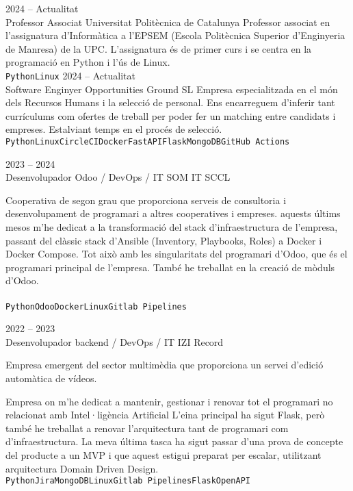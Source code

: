 \documentclass[9pt]{developercv} %
\begin{document}
\begin{entrylist}
	\entry
		{2024 -- Actualitat\\}
		{Professor Associat}
		{Universitat Politècnica de Catalunya}
		{Professor associat en l'assignatura d'Informàtica a l'EPSEM (Escola Politècnica Superior d'Enginyeria de Manresa) de la UPC. L'assignatura és de primer curs i se centra en la programació en Python i l'ús de Linux.
		\\ \texttt{Python}\slashsep\texttt{Linux}}
	\entry
		{2024 -- Actualitat\\}
		{Software Enginyer}
		{Opportunities Ground SL}
		{Empresa especialitzada en el món dels Recursos Humans i la selecció de personal. Ens encarreguem d'inferir tant currículums com ofertes de treball per poder fer un matching entre candidats i empreses. Estalviant temps en el procés de selecció.
		\\ \texttt{Python}\slashsep\texttt{Linux}\slashsep\texttt{CircleCI}\slashsep\texttt{Docker}\slashsep\texttt{FastAPI}\slashsep\texttt{Flask}\slashsep\texttt{MongoDB}\slashsep\texttt{GitHub Actions}}

	\entry
		{2023 -- 2024\\}
		{Desenvolupador Odoo / DevOps / IT}
		{SOM IT SCCL}
		{Cooperativa de segon grau que proporciona serveis de consultoria i desenvolupament de programari a altres cooperatives i empreses.
		aquests últims mesos m'he dedicat a la transformació del stack d'infraestructura de l'empresa, passant del clàssic stack d'Ansible (Inventory, Playbooks, Roles) a Docker i Docker Compose. Tot això amb les singularitats del programari d'Odoo, que és el programari principal de l'empresa. També he treballat en la creació de mòduls d'Odoo.\\
		\\ \texttt{Python}\slashsep\texttt{Odoo}\slashsep\texttt{Docker}\slashsep\texttt{Linux}\slashsep\texttt{Gitlab Pipelines}

		}
	\entry
		{2022 -- 2023\\}
		{Desenvolupador backend / DevOps / IT}
		{IZI Record}
		{Empresa emergent del sector multimèdia que proporciona un servei d'edició automàtica de vídeos.

		Empresa on m'he dedicat a mantenir, gestionar i renovar tot el programari no relacionat amb Intel·ligència Artificial  L'eina principal ha sigut Flask, però també he treballat a renovar
		l'arquitectura tant de programari com d'infraestructura. La meva última tasca ha sigut passar d'una prova de concepte del producte a un MVP i que aquest estigui preparat per escalar, utilitzant arquitectura Domain Driven Design.
		\\ \texttt{Python}\slashsep\texttt{Jira}\slashsep\texttt{MongoDB}\slashsep\texttt{Linux}\slashsep\texttt{Gitlab Pipelines}\slashsep\texttt{Flask}\slashsep\texttt{OpenAPI}}


\end{entrylist}
\end{document}
